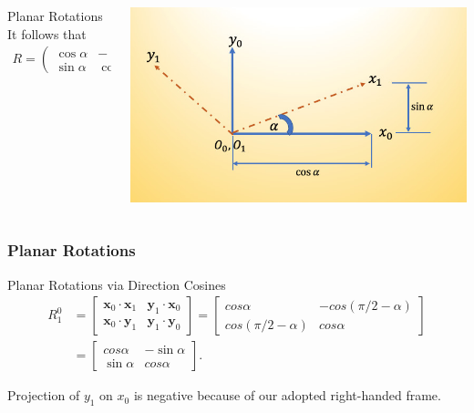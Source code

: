 \begin{frame}
	\begin{columns}[]
		\begin{column}{.5\linewidth}
			\begin{block}{Planar Rotations}
				It follows that
				\begin{align}
					R = \left(\begin{array}{cc}
						\cos \alpha & -\sin \alpha \\ \sin \alpha &  \cos \alpha
					\end{array}\right)
				\end{align}
			\end{block}
		\end{column}
		\begin{column}{.5\linewidth}
			\centering
			\includegraphics[width=\textwidth]{../Notes/figures/planar_rot.jpg}
		\end{column}
	\end{columns}
\end{frame}


\begin{frame}
	\frametitle{Planar Rotations}
			\begin{block}{Planar Rotations via Direction Cosines}
				\begin{align}
					R_1^0 &= \begin{bmatrix}
						\bm{x}_0 \cdot \bm{x}_1 & \bm{y}_1 \cdot \bm{x}_0 \\
						\bm{x}_0 \cdot \bm{y}_1 & \bm{y}_1 \cdot \bm{y}_0
					\end{bmatrix} =  \begin{bmatrix}
					cos \alpha &  -cos(\pi/2 - \alpha) \\
					cos(\pi/2 - \alpha) & cos \alpha
				\end{bmatrix} \nonumber \\
		&=  \begin{bmatrix}
		cos \alpha &   - \sin \alpha  \\
		\sin \alpha  & cos \alpha
	\end{bmatrix}.
				\end{align}
			\end{block}
		\footnotesize{Projection of $y_1$ on $x_0$ is negative because of our adopted right-handed frame.}
\end{frame}

